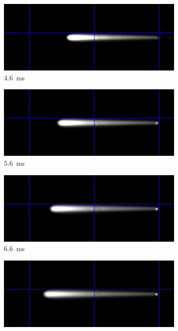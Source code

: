 \begin{figure}[h]
\begin{subfigure}[t]{0.47\textwidth}
        \centering
        \includegraphics[width=\textwidth]{assets/5 results/1msFrames/46.jpg}
        \caption{\qty{4.6}{ms}}
        \label{fig:growth_frames_46}
    \end{subfigure}
    \hfill
    \begin{subfigure}[t]{0.47\textwidth}
        \centering
        \includegraphics[width=\textwidth]{assets/5 results/1msFrames/56.jpg}
        \caption{\qty{5.6}{ms}}
        \label{fig:growth_frames_56}
    \end{subfigure}
    \hfill
    \begin{subfigure}[t]{0.47\textwidth}
        \centering
        \includegraphics[width=\textwidth]{assets/5 results/1msFrames/66.jpg}
        \caption{\qty{6.6}{ms}}
        \label{fig:growth_frames_66}
    \end{subfigure}
    \hfill
    \begin{subfigure}[t]{0.47\textwidth}
        \centering
        \includegraphics[width=\textwidth]{assets/5 results/1msFrames/76.jpg}

\end{subfigure}
\end{figure}
